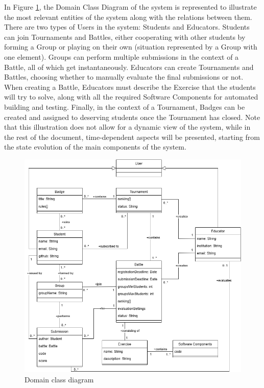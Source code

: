 In Figure \ref{fig:ClassDiagram}, the Domain Class Diagram of the system is represented to illustrate the most relevant entities of the system along with the relations between them. There are two types of Users in the system: Students and Educators. Students can join Tournaments and Battles, either cooperating with other students by forming a Group or playing on their own (situation represented by a Group with one element). Groups can perform multiple submissions in the context of a Battle, all of which get instantaneously. Educators can create Tournaments and Battles, choosing whether to manually evaluate the final submissions or not. When creating a Battle, Educators must describe the Exercise that the students will try to solve, along with all the required Software Components for automated building and testing. Finally, in the context of a Tournament, Badges can be created and assigned to deserving students once the Tournament has closed. Note that this illustration does not allow for a dynamic view of the system, while in the rest of the document, time-dependent aspects will be presented, starting from the state evolution of the main components of the system.

\begin{figure}[h!]
  \centering
  \includegraphics[width=1\textwidth]{Images/DomainClassDiagram.png}
  \caption{Domain class diagram}
  \label{fig:ClassDiagram}
\end{figure}

